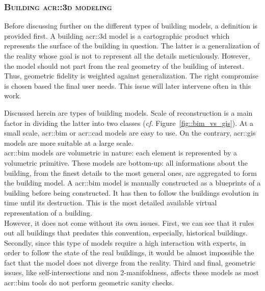         \subsubsection{\textsc{Building \texorpdfstring{\gls*{acr::3d}}{3D} modeling}}
            Before discussing further on the different types of building models, a definition is provided first.
            A building \gls{acr::3d} model is a cartographic product which represents the surface of the building in question.
            The latter is a generalization of the reality whose goal is not to represent all the details meticulously.
            However, the model should not part from the real geometry of the building of interest.
            Thus, geometric fidelity is weighted against generalization.
            The right compromise is chosen based the final user needs.
            This issue will later intervene often in this work.

            Discussed herein are types of building models.
            Scale of reconstruction is a main factor in dividing the latter into two classes (\textit{cf.} Figure~\ref{fig::bim_vs_gis}).
            At a small scale, \gls{acr::bim} or \gls{acr::cad} models are easy to use.
            On the contrary, \gls{acr::gis} models are more suitable at a large scale.\\

            \gls{acr::bim} models are volumetric in nature:
            each element is represented by a volumetric primitive.
            These models are bottom-up: all informations about the building, from the finest details to the most general ones, are aggregated to form the building model.
            A \gls{acr::bim} model is manually constructed as a blueprints of a building before being constructed.
            It has then to follow the buildings evolution in time until its destruction.
            This is the most detailed available virtual representation of a building.\\
            However, it does not come without its own issues.
            First, we can see that it rules out all buildings that predates this convention, especially, historical buildings.
            Secondly, since this type of models require a high interaction with experts, in order to follow the state of the real buildings, it would be almost impossible the fact that the model does not diverge from the reality\addref.
            Third and final, geometric issues, like self-intersections and non 2-manifoldness, affects these models as most \gls{acr::bim} tools do not perform geometric sanity checks.\\

